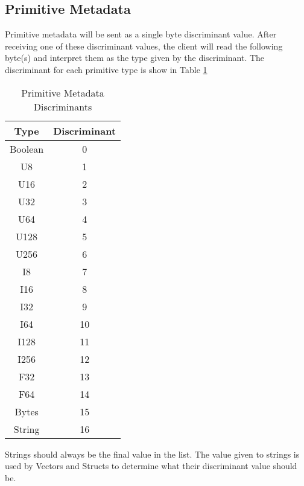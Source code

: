 \documentclass[conference]{IEEEtran}
\begin{document}
\subsection{Primitive Metadata}

Primitive metadata will be sent as a single byte discriminant value. After receiving one of these discriminant values, the client will read the following byte(s) and interpret them as the type given by the discriminant. The discriminant for each primitive type is show in Table \ref{discriminants}

\begin{table}[htbp]
	\caption{Primitive Metadata Discriminants}\label{discriminants}
	\begin{center}
		\begin{tabular}{|c|c|}
			\hline
			\textbf{Type} & \textbf{Discriminant} \\
			\hline
			Boolean       & 0                     \\
			U8            & 1                     \\
			U16           & 2                     \\
			U32           & 3                     \\
			U64           & 4                     \\
			U128          & 5                     \\
			U256          & 6                     \\
			I8            & 7                     \\
			I16           & 8                     \\
			I32           & 9                     \\
			I64           & 10                    \\
			I128          & 11                    \\
			I256          & 12                    \\
			F32           & 13                    \\
			F64           & 14                    \\
			Bytes         & 15                    \\
			String        & 16                    \\
			\hline
		\end{tabular}
	\end{center}
\end{table}

Strings should always be the final value in the list. The value given to strings
is used by Vectors and Structs to determine what their discriminant value should
be.
\end{document}
